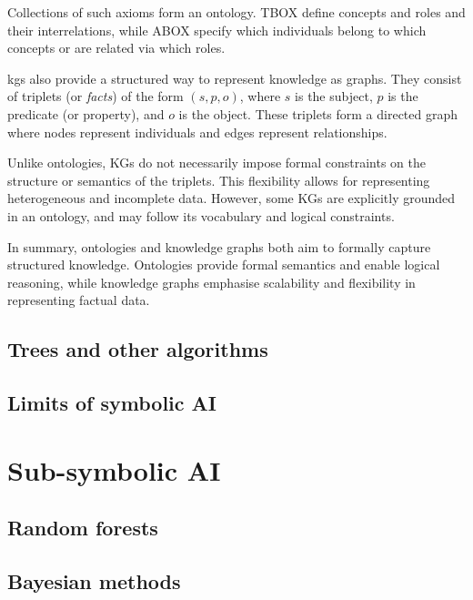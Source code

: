 Collections of such axioms form an ontology.
%
\Gls{TBOX} define concepts and roles and their interrelations, while \gls{ABOX} specify which individuals belong to which concepts or are related via which roles.

\glspl{kg} also provide a structured way to represent knowledge as graphs.
%
They consist of triplets (or \emph{facts}) of the form $(s, p, o)$, where $s$ is the subject, $p$ is the predicate (or property), and $o$ is the object.
%
These triplets form a directed graph where nodes represent individuals and edges represent relationships.

Unlike ontologies, KGs do not necessarily impose formal constraints on the structure or semantics of the triplets.
%
This flexibility allows for representing heterogeneous and incomplete data.
%
However, some \glspl{KG} are explicitly grounded in an ontology, and may follow its vocabulary and logical constraints.

In summary, ontologies and knowledge graphs both aim to formally capture structured knowledge.
%
Ontologies provide formal semantics and enable logical reasoning, while knowledge graphs emphasise scalability and flexibility in representing factual data.




\subsection{Trees and other algorithms}\label{subsec:trees-and-other-algorithms}

\subsection{Limits of symbolic \Gls{AI}}\label{subsec:limits-of-symbolic-ai}



\section{Sub-symbolic \Gls{AI}}\label{sec:sub-symbolic-ai}

\subsection{Random forests}\label{subsec:random-forests}

\subsection{Bayesian methods}\label{subsec:bayesian-methods}

